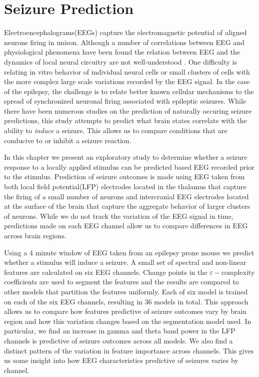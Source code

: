 \chapter{Seizure Prediction}

Electroencephalograms(EEGs) capture the electromagnetic 
potential of aligned neurons firing in unison. 
Although a number of correlations between 
EEG and physiological phenomena have been found the relation between EEG and the dynamics of local neural circuitry are not well-understood \cite{eeg}. 
One difficulty is relating in vitro behavior of individual neural cells or small clusters of cells with the more complex 
large scale variations recorded by the EEG signal.  
In the case of the epilepsy, the challenge is to relate better known 
cellular mechanisms to the spread of synchronized neuronal firing associated with epileptic seizures. 
While there have been numerous studies on the prediction of
naturally occuring seizure predictions, this study attempts 
to predict what brain states correlate with the ability to 
 \textit{induce} a seizure. This allows us to compare 
 conditions that are conducive to or inhibit a seizure 
 reaction. 

In this chapter we present an exploratory study to determine whether 
a seizure response to a locally applied stimulus
can be predicted based EEG recorded prior to the stimulus. Prediction of seizure outcomes is made using EEG taken from both local field potential(LFP) electrodes located in the thalamus that capture the firing of a small number of neurons and intercranial EEG electrodes located at the surface of the brain that capture the aggregate behavior of larger clusters of neurons. While we do not track the variation of the EEG signal in time, predictions made on each EEG channel allow us to compare differences in EEG across brain regions. 

Using a 4 minute window of EEG taken from an 
epilepsy prone mouse we predict whether a stimulus
will induce a seizure.  
A small set of spectral and non-linear 
features are calculated on six EEG channels. 
Change points in the $\varepsilon-$complexity coefficients
are used to segment the features and the results 
are compared to other models that partition the features uniformly. 
Each of six model is trained on each of the six EEG channels,
resulting in 36 models in total.
 This approach allows us to compare 
how features predictive of seizure outcomes vary by brain region 
and how this variation changes based on the segmentation model
used. 
 In particular, we find an increase in gamma and theta band power in the LFP channels is predictive of seizure outcomes across all models. We also find a distinct pattern of the variation in feature 
 importance across channels. This gives us some insight into how 
 EEG characteristics predictive of seizures varies by channel.



